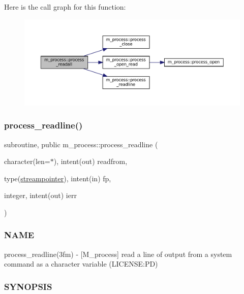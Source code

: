Here is the call graph for this function\+:
\nopagebreak
\begin{figure}[H]
\begin{center}
\leavevmode
\includegraphics[width=350pt]{namespacem__process_a7dd759a1344789477ae1e205d7fa9a51_cgraph}
\end{center}
\end{figure}
\mbox{\label{namespacem__process_acbc72c5ed371430a471aa1f3010fbbda}} 
\subsubsection{\texorpdfstring{process\+\_\+readline()}{process\_readline()}}
{\footnotesize\ttfamily subroutine, public m\+\_\+process\+::process\+\_\+readline (\begin{DoxyParamCaption}\item[{character(len=$\ast$), intent(out)}]{readfrom,  }\item[{type(\mbox{\hyperlink{structm__process_1_1streampointer}{streampointer}}), intent(in)}]{fp,  }\item[{integer, intent(out)}]{ierr }\end{DoxyParamCaption})}



\subsubsection*{N\+A\+ME}

process\+\_\+readline(3fm) -\/ \mbox{[}M\+\_\+process\mbox{]} read a line of output from a system command as a character variable (L\+I\+C\+E\+N\+SE\+:PD) 

\subsubsection*{S\+Y\+N\+O\+P\+S\+IS}

